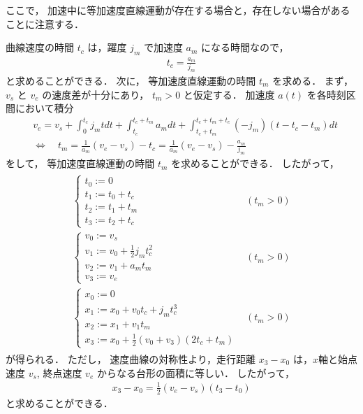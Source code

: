 \documentclass[a5paper]{ltjsarticle}
\begin{document}
ここで，
加速中に等加速度直線運動が存在する場合と，存在しない場合があることに注意する．

曲線速度の時間 $t_c$ は，躍度 $j_m$ で加速度 $a_m$ になる時間なので，
\begin{align}
    t_c = \frac{a_m}{j_m}
\end{align}
と求めることができる．
次に，
等加速度直線運動の時間 $t_m$ を求める．
まず，
$v_s$ と $v_e$ の速度差が十分にあり， $t_m>0$ と仮定する．
加速度 $a(t)$ を各時刻区間において積分
\begin{align}
     &
    v_e
    =
    v_s + \int_{0}^{t_c}j_m t dt + \int_{t_c}^{t_c+t_m} a_m dt + \int_{t_c+t_m}^{t_c+t_m+t_c} (-j_m)(t-t_c-t_m) dt
    \\
     &
    \Leftrightarrow\quad
    t_m = \frac{1}{a_m}(v_e-v_s) - t_c
    = \frac{1}{a_m}(v_e-v_s) - \frac{a_m}{j_m}
\end{align}
をして，
等加速度直線運動の時間 $t_m$ を求めることができる．
したがって，
\begin{align}
    \begin{array}{ll}
        \left\{ \begin{array}{l}
            t_0 := 0         \\
            t_1 := t_0 + t_c \\
            t_2 := t_1 + t_m \\
            t_3 := t_2 + t_c
        \end{array} \right.
         &
        (t_m > 0)
        \\
        \left\{ \begin{array}{l}
            v_0 := v_s                        \\
            v_1 := v_0 + \frac{1}{2}j_m t_c^2 \\
            v_2 := v_1 + a_m t_m              \\
            v_3 := v_e
        \end{array} \right.
         &
        (t_m > 0)
        \\
        \left\{ \begin{array}{l}
            x_0 := 0                         \\
            x_1 := x_0 + v_0 t_c + j_m t_c^3 \\
            x_2 := x_1 + v_1 t_m             \\
            x_3 := x_0 + \frac{1}{2} (v_0+v_3) (2t_c+t_m)
        \end{array} \right.
         &
        (t_m > 0)
    \end{array}
\end{align}
が得られる．
ただし，
速度曲線の対称性より，走行距離 $x_3-x_0$ は，$x$軸と始点速度 $v_s$, 終点速度 $v_e$ からなる台形の面積に等しい．
したがって，
\begin{align}
    x_3-x_0 = \frac{1}{2}\left( v_e-v_s \right) \left( t_3-t_0 \right)
\end{align}
と求めることができる．
\end{document}
